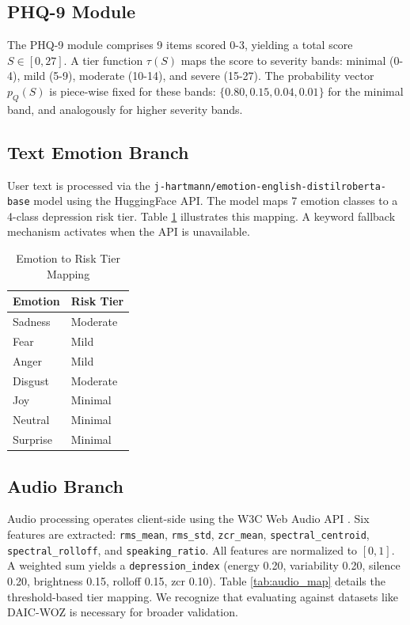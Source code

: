 \documentclass[conference]{IEEEtran}
\begin{document}
\subsection{PHQ-9 Module}
The PHQ-9 module comprises 9 items scored 0-3, yielding a total score $S \in [0, 27]$. A tier function $\tau(S)$ maps the score to severity bands: minimal (0-4), mild (5-9), moderate (10-14), and severe (15-27). The probability vector $p_Q(S)$ is piece-wise fixed for these bands: $\{0.80, 0.15, 0.04, 0.01\}$ for the minimal band, and analogously for higher severity bands.

\subsection{Text Emotion Branch}
User text is processed via the \texttt{j-hartmann/emotion-english-distilroberta-base} model \cite{hartmann_model} using the HuggingFace API. The model maps 7 emotion classes to a 4-class depression risk tier. Table \ref{tab:emotion_map} illustrates this mapping. A keyword fallback mechanism activates when the API is unavailable.

\begin{table}[htbp]
\caption{Emotion to Risk Tier Mapping}
\label{tab:emotion_map}
\centering
\begin{tabular}{ll}
\toprule
\textbf{Emotion} & \textbf{Risk Tier} \\
\midrule
Sadness & Moderate \\
Fear & Mild \\
Anger & Mild \\
Disgust & Moderate \\
Joy & Minimal \\
Neutral & Minimal \\
Surprise & Minimal \\
\bottomrule
\end{tabular}
\end{table}

\subsection{Audio Branch}
Audio processing operates client-side using the W3C Web Audio API \cite{w3c_webaudio}. Six features are extracted: \texttt{rms\_mean}, \texttt{rms\_std}, \texttt{zcr\_mean}, \texttt{spectral\_centroid}, \texttt{spectral\_rolloff}, and \texttt{speaking\_ratio}. All features are normalized to $[0, 1]$. A weighted sum yields a \texttt{depression\_index} (energy 0.20, variability 0.20, silence 0.20, brightness 0.15, rolloff 0.15, zcr 0.10). Table \ref{tab:audio_map} details the threshold-based tier mapping. We recognize that evaluating against datasets like DAIC-WOZ \cite{gratch_daic} is necessary for broader validation.
\end{document}
